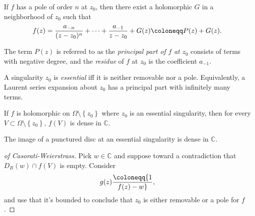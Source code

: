 \begin{definition}

If \(f\) has a pole of order \(n\) at \(z_0\), then there exist a
holomorphic \(G\) in a neighborhood of \(z_0\) such that
\begin{align*}
f(z) = {a_{-n} \over (z-z_0)^n } + \cdots + {a_{-1} \over z-z_0} + G(z) \coloneqq P(z) + G(z)
.\end{align*}

The term \(P(z)\) is referred to as the \emph{principal part of \(f\) at
\(z_0\)} consists of terms with negative degree, and the \emph{residue}
of \(f\) at \(z_0\) is the coefficient \(a_{-1}\).

\end{definition}

\begin{definition}

A singularity \(z_0\) is \emph{essential} iff it is neither removable
nor a pole. Equivalently, a Laurent series expansion about \(z_0\) has a
principal part with infinitely many terms.

\end{definition}

\begin{theorem}\label{Casorati}

If \(f\) is holomorphic on \(\Omega\setminus\left\{{z_0}\right\}\) where
\(z_0\) is an essential singularity, then for every
\(V\subset \Omega\setminus\left\{{z_0}\right\}\), \(f(V)\) is dense in
\({\mathbb{C}}\).

\end{theorem}

\begin{slogan}

The image of a punctured disc at an essential singularity is dense in
\({\mathbb{C}}\).

\end{slogan}

\begin{proof}[of Casorati-Weierstrass]

Pick \(w\in {\mathbb{C}}\) and suppose toward a contradiction that
\(D_R(w) \cap f(V)\) is empty. Consider
\begin{align*}
g(z) \coloneqq{1\over f(z) - w}
,\end{align*}
and use that it's bounded to conclude that \(z_0\) is either removable
or a pole for \(f\).

\end{proof}

